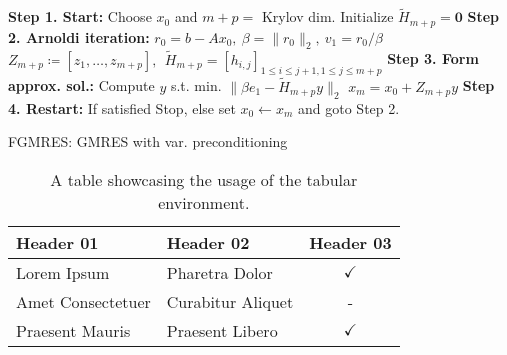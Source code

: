 {\small \begin{center}  
        \begin{minipage}{0.95\textwidth}
            \begin{algorithm}[H]
                \SetAlgoLined
                \textbf{Step 1. Start:} Choose $x_0$ and $m+p=$ Krylov dim. Initialize $\widetilde{H}_{m+p} =\textbf{0}$\;
                \textbf{Step 2. Arnoldi iteration:} $r_0=b-Ax_0,~\beta = \|r_0\|_2,~ v_1 = r_0/\beta$\;
                $Z_{m+p}\coloneqq[z_1,\dots,z_{m+p}],~~\widetilde{H}_{m+p} = [h_{i,j}]_{1\le i \le j+1, 1\le j \le m + p}$\; 
                \textbf{Step 3. Form approx. sol.:} Compute $y$ s.t. min. $\|\beta e_1 - \widetilde{H}_{m+p}y\|_2$\;
                $x_m = x_0 + Z_{m+p}y$\;
                \textbf{Step 4. Restart:} If satisfied Stop, else set $x_0\leftarrow x_m$ and goto Step 2.
            \caption{FGMRES: GMRES with var. preconditioning}
            \end{algorithm}
        \end{minipage}
    \end{center}
    }

\begin{table}[!htpb]
    \centering
    \begin{tabular}{llc}
        \toprule
        \textbf{Header 01} & \textbf{Header 02} & \textbf{Header 03} \\ 
        \midrule
        Lorem Ipsum         & Pharetra Dolor    & $\checkmark$  \\
        Amet Consectetuer   & Curabitur Aliquet & -             \\
        Praesent Mauris     & Praesent Libero   & $\checkmark$  \\
        \bottomrule
    \end{tabular}
    \caption{A table showcasing the usage of the tabular environment.}
    \label{tab:table-01}
\end{table}